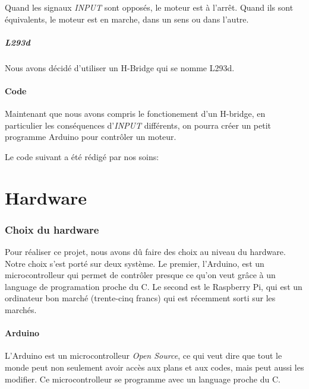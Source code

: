 \documentclass[a4paper,12pt]{article}
\begin{document}
{\begin{table}
\caption{\label{tableDeVerite} Table de v\'erit\'e accompagnant le sch\'ema du
H-bridge (fig.(\ref{H-bridge}))}

\small Quand les signaux \emph{INPUT} sont oppos\'es, le moteur est \`a
l'arr\^et. Quand ils sont \'equivalents, le moteur est en marche, dans un sens
ou dans l'autre.\normalsize
\end{table}

\subsubsection{L293d}
Nous avons décidé d'utiliser un H-Bridge qui se nomme L293d.

\subsection{Code}

Maintenant que nous avons compris le fonctionement d'un H-bridge, en
particulier les cons\'equences d'\emph{INPUT} diff\'erents, on pourra cr\'eer
un petit programme Arduino pour contr\^oler un moteur.

Le code suivant a \'et\'e r\'edig\'e par nos soins:






\part{Hardware}

\section{Choix du hardware}
Pour réaliser ce projet, nous avons dû faire des choix au niveau du hardware. Notre choix s'est porté sur deux système. Le premier, l'Arduino, est un microcontrolleur qui permet de contrôler presque ce qu'on veut grâce à un language de programation proche du C. Le second est le Raspberry Pi, qui est un ordinateur bon marché (trente-cinq francs) qui est récemment sorti sur les marchés. 


\subsection{Arduino}
L'Arduino \cite{Arduino} est un microcontrolleur \textit{Open Source}, ce qui veut dire que tout le monde peut non seulement avoir accès aux plans et aux codes, mais peut aussi les modifier. Ce microcontrolleur se programme avec un language proche du C. 


}
\end{document}
